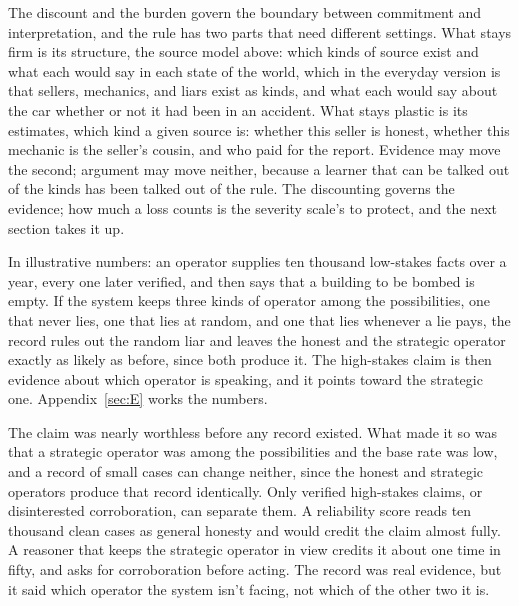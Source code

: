 
The discount and the burden govern the boundary between commitment and interpretation, and the rule has two parts that need different settings. What stays firm is its structure, the source model above: which kinds of source exist and what each would say in each state of the world, which in the everyday version is that sellers, mechanics, and liars exist as kinds, and what each would say about the car whether or not it had been in an accident. What stays plastic is its estimates, which kind a given source is: whether this seller is honest, whether this mechanic is the seller's cousin, and who paid for the report. Evidence may move the second; argument may move neither, because a learner that can be talked out of the kinds has been talked out of the rule.
The discounting governs the evidence; how much a loss counts is the severity scale's to protect, and the next section takes it up.

In illustrative numbers: an operator supplies ten thousand low-stakes facts over a year, every one later verified, and then says that a building to be bombed is empty. If the system keeps three kinds of operator among the possibilities, one that never lies, one that lies at random, and one that lies whenever a lie pays, the record rules out the random liar and leaves the honest and the strategic operator exactly as likely as before, since both produce it. The high-stakes claim is then evidence about which operator is speaking, and it points toward the strategic one. Appendix~\ref{sec:E} works the numbers.

The claim was nearly worthless before any record existed. What made it so was that a strategic operator was among the possibilities and the base rate was low, and a record of small cases can change neither, since the honest and strategic operators produce that record identically. Only verified high-stakes claims, or disinterested corroboration, can separate them. A reliability score reads ten thousand clean cases as general honesty and would credit the claim almost fully. A reasoner that keeps the strategic operator in view credits it about one time in fifty, and asks for corroboration before acting. The record was real evidence, but it said which operator the system isn't facing, not which of the other two it is.

